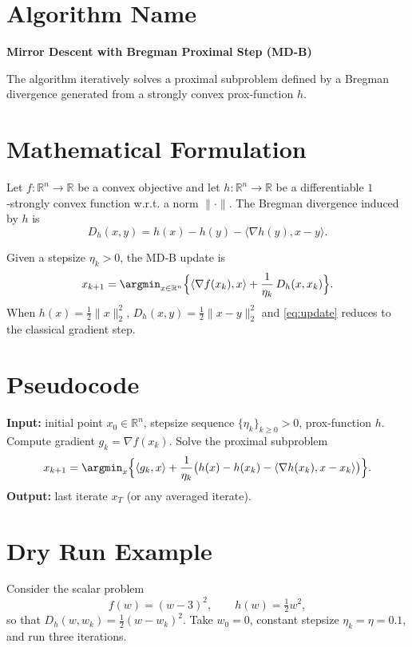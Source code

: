 \documentclass{article}
\newcommand{\grad}{\nabla}
\newcommand{\inner}[2]{\langle #1,#2\rangle}
\newcommand{\Breg}[2]{D_h(#1,#2)}
\newcommand{\R}{\mathbb{R}}
\begin{document}
\section*{Algorithm Name}
\textbf{Mirror Descent with Bregman Proximal Step (MD‑B)}  

The algorithm iteratively solves a proximal subproblem defined by a Bregman divergence generated from a strongly convex prox‑function $h$.

\section*{Mathematical Formulation}
Let $f:\R^n\rightarrow\R$ be a convex objective and let $h:\R^n\rightarrow\R$ be a differentiable $1$‑strongly convex function w.r.t. a norm $\|\cdot\|$.  
The Bregman divergence induced by $h$ is
\[
\Breg{x}{y}=h(x)-h(y)-\inner{\grad h(y)}{x-y}.
\]

Given a stepsize $\eta_k>0$, the MD‑B update is
\begin{equation}
\label{eq:update}
x_{k+1}= \argmin_{x\in\R^n}\Big\{ \inner{\grad f(x_k)}{x}+ \frac{1}{\eta_k}\,\Breg{x}{x_k}\Big\}.
\end{equation}
When $h(x)=\tfrac12\|x\|_2^{2}$, $\Breg{x}{y}=\tfrac12\|x-y\|_2^{2}$ and \eqref{eq:update} reduces to the classical gradient step.

\section*{Pseudocode}
\begin{algorithm}[H]
\caption{Mirror Descent with Bregman Proximal Step}
\begin{algorithmic}[1]
\STATE \textbf{Input:} initial point $x_0\in\R^n$, stepsize sequence $\{\eta_k\}_{k\ge0}>0$, prox‑function $h$.
    \STATE Compute gradient $g_k=\grad f(x_k)$.
    \STATE Solve the proximal subproblem
    \[
    x_{k+1}= \argmin_{x}\Big\{ \inner{g_k}{x}+ \frac{1}{\eta_k}\big(h(x)-h(x_k)-\inner{\grad h(x_k)}{x-x_k}\big)\Big\}.
    \]
\ENDFOR
\STATE \textbf{Output:} last iterate $x_T$ (or any averaged iterate).
\end{algorithmic}
\end{algorithm}

\section*{Dry Run Example}
Consider the scalar problem
\[
f(w)=(w-3)^2,\qquad h(w)=\tfrac12 w^{2},
\]
so that $\Breg{w}{w_k}= \tfrac12 (w-w_k)^2$.
Take $w_0=0$, constant stepsize $\eta_k=\eta=0.1$, and run three iterations.
\end{document}
